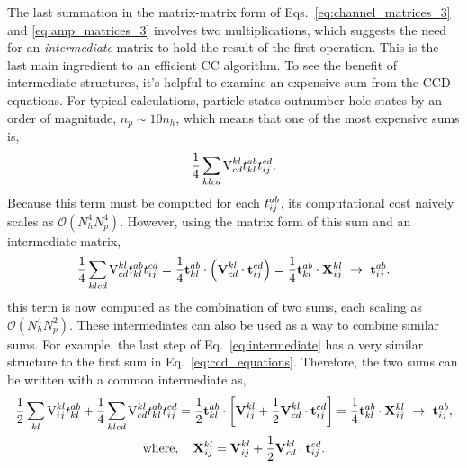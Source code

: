 \documentclass[thesis.tex]{subfiles}
\begin{document}
The last summation in the matrix-matrix form of Eqs.\ \eqref{eq:channel_matrices_3} and \eqref{eq:amp_matrices_3} involves two multiplications, which suggests the need for an \textit{intermediate} matrix to hold the result of the first operation.  This is the last main ingredient to an efficient CC algorithm.  To see the benefit of intermediate structures, it's helpful to examine an expensive sum from the CCD equations.  For typical calculations, particle states outnumber hole states by an order of magnitude, $n_{p} \sim 10n_{h}$, which means that one of the most expensive sums is,
\begin{equation}
  \frac{1}{4}\sum\limits_{\mathclap{klcd}}\vint{kl}{cd}\tamp{ab}{kl}\tamp{cd}{ij}.
\end{equation}
Because this term must be computed for each $t^{ab}_{ij}$, its computational cost naively scales as $\mathcal{O}\left( N_{h}^{4}N_{p}^{4}\right)$.  However, using the matrix form of this sum and an intermediate matrix,
\begin{equation} \label{eq:intermediate}
  \frac{1}{4}\sum\limits_{\mathclap{klcd}}\vint{kl}{cd}\tamp{ab}{kl}\tamp{cd}{ij} = \frac{1}{4}\btamp{ab}{kl}\cdot\left(\bvint{kl}{cd}\cdot\btamp{cd}{ij}\right) = \frac{1}{4}\btamp{ab}{kl}\cdot\bxint{kl}{ij}\ \rightarrow\ \btamp{ab}{ij}.
\end{equation}
this term is now computed as the combination of two sums, each scaling as $\mathcal{O}\left( N_{h}^{4}N_{p}^{2}\right)$.  These intermediates can also be used as a way to combine similar sums.  For example, the last step of Eq.\ \eqref{eq:intermediate} has a very similar structure to the first sum in Eq.\ \eqref{eq:ccd_equations}.  Therefore, the two sums can be written with a common intermediate as,
\begin{gather} \label{eq:intermediate_2}
  \frac{1}{2}\sum\limits_{\mathclap{kl}}\vint{kl}{ij}\tamp{ab}{kl} + \frac{1}{4}\sum\limits_{\mathclap{klcd}}\vint{kl}{cd}\tamp{ab}{kl}\tamp{cd}{ij} = \frac{1}{2}\btamp{ab}{kl}\cdot\left[ \bvint{kl}{ij} + \frac{1}{2}\bvint{kl}{cd}\cdot\btamp{cd}{ij} \right] = \frac{1}{4}\btamp{ab}{kl}\cdot\bxint{kl}{ij}\ \rightarrow\ \btamp{ab}{ij}, \notag \\
  \text{where},\hspace{10pt} \bxint{kl}{ij} = \bvint{kl}{ij} + \frac{1}{2}\bvint{kl}{cd}\cdot\btamp{cd}{ij}.
\end{gather}
\end{document}
